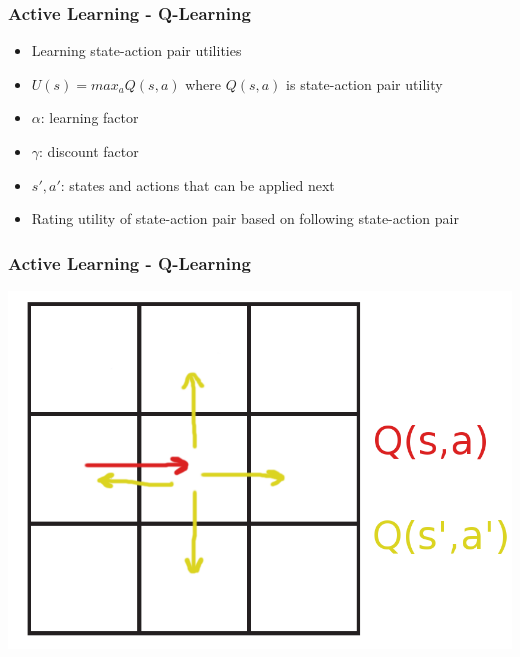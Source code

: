 \begin{frame}
    \frametitle{Active Learning - Q-Learning}
    \begin{itemize}
    	\item Learning state-action pair utilities
    	\item $U(s) = max_{a}Q(s,a)$ where $Q(s,a)$ is state-action pair utility
	\end{itemize}
	
	
	\begin{itemize}
		\item $\alpha$: learning factor
		\item $\gamma$: discount factor
		\item $s',a'$: states and actions that can be applied next
		\item Rating utility of state-action pair based on following state-action pair
	\end{itemize}
\end{frame}

\begin{frame}
    \frametitle{Active Learning - Q-Learning}
    
	
	\begin{center}
		\includegraphics[width=0.6\linewidth]{img-michael/q_learning.png}
	\end{center}
\end{frame}

